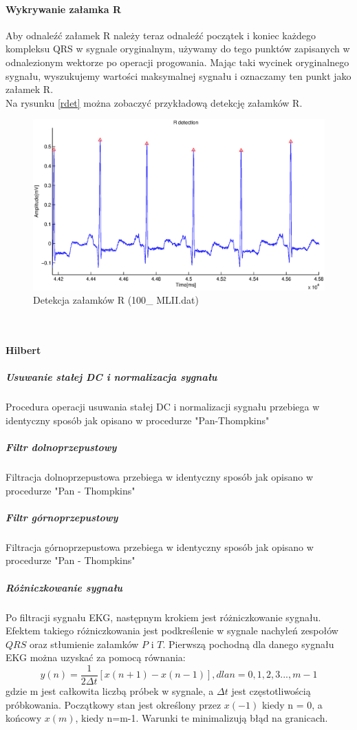 \documentclass[a4paper, 11pt]{article}
\begin{document}
\paragraph{Wykrywanie załamka R}
\indent Aby odnaleźć załamek R należy teraz odnaleźć początek i koniec każdego kompleksu QRS w sygnale oryginalnym, używamy do tego punktów zapisanych w odnalezionym wektorze po operacji progowania. Mając taki wycinek oryginalnego sygnału, wyszukujemy wartości maksymalnej sygnału i oznaczamy ten punkt jako załamek R.\\
Na rysunku \eqref{rdet} można zobaczyć przykładową detekcję załamków R.
\begin{figure}[ht]
\centering
\includegraphics[scale=0.5]{include/rpeaks.eps}
\caption{Detekcja załamków R (100\_ MLII.dat)}
\label{rdet}
\end{figure}\\

\paragraph{Hilbert}
\label{sec:rs:papers}
\subparagraph{Usuwanie stałej DC i normalizacja sygnału}
Procedura operacji usuwania stałej DC i normalizacji sygnału przebiega w identyczny sposób jak opisano w procedurze "Pan-Thompkins"
\subparagraph{Filtr dolnoprzepustowy}
Filtracja dolnoprzepustowa przebiega w identyczny sposób jak opisano w procedurze "Pan - Thompkins"
\subparagraph{Filtr górnoprzepustowy}
Filtracja górnoprzepustowa przebiega w identyczny sposób jak opisano w procedurze "Pan - Thompkins"
\subparagraph{Różniczkowanie sygnału}
Po filtracji sygnału EKG, następnym krokiem jest różniczkowanie sygnału. Efektem takiego różniczkowania jest podkreślenie w sygnale nachyleń zespołów $QRS$ oraz stłumienie załamków $P$ i $T$. Pierwszą pochodną dla danego sygnału EKG można uzyskać za pomocą równania:
\begin{equation}
y(n) = \frac{1}{2 \Delta t}[x(n+1)-x(n-1)], dla n=0,1,2,3...,m-1\label{eq:h}
\end{equation}
gdzie m jest całkowita liczbą próbek w sygnale, a $\Delta t$ jest częstotliwością próbkowania.
Początkowy stan jest określony przez $x(-1)$ kiedy n = 0, a końcowy $x(m)$, kiedy n=m-1.
Warunki te minimalizują błąd na granicach.
\end{document}
